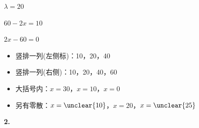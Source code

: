 $\lambda=20$ %

$60-2x=10$\ 

$2x-60=0$

\begin{itemize}
\item 竖排一列(左侧标)：10，20，40
\item 竖排一列(右侧)：10，20，40，60
\item 大括号内：$x=30$，$x=10$，$x=0$
\item 另有零散：$x=\unclear{10}$，$x=20$，$x=\unclear{25}$ %
\end{itemize}
\textbf{2.}

